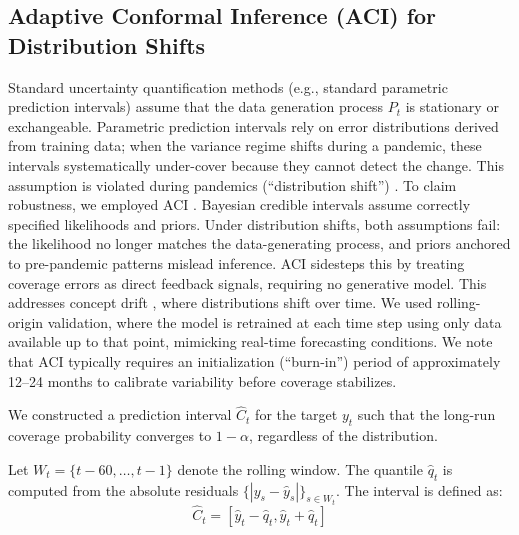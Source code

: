 \documentclass[final,3p,times,twocolumn,authoryear]{elsarticle}
\begin{document}
\subsection{Adaptive Conformal Inference (ACI) for Distribution Shifts}
\label{sec:aci_math}
Standard uncertainty quantification methods (e.g., standard parametric prediction intervals) assume that the data generation process $P_t$ is stationary or exchangeable. Parametric prediction intervals rely on error distributions derived from training data; when the variance regime shifts during a pandemic, these intervals systematically under-cover because they cannot detect the change. This assumption is violated during pandemics (``distribution shift'') \citep{quinonero2009dataset}. To claim robustness, we employed ACI \citep{lei2018distribution, gibbs2021adaptive, angelopoulos2022gentle}. Bayesian credible intervals assume correctly specified likelihoods and priors. Under distribution shifts, both assumptions fail: the likelihood no longer matches the data-generating process, and priors anchored to pre-pandemic patterns mislead inference. ACI sidesteps this by treating coverage errors as direct feedback signals, requiring no generative model. This addresses concept drift \citep{gama2014survey}, where distributions shift over time. We used rolling-origin validation, where the model is retrained at each time step using only data available up to that point, mimicking real-time forecasting conditions. We note that ACI typically requires an initialization (``burn-in'') period of approximately 12--24 months to calibrate variability before coverage stabilizes. 

We constructed a prediction interval $\hat{C}_t$ for the target $y_t$ such that the long-run coverage probability converges to $1-\alpha$, regardless of the distribution.

Let $W_t = \{t-60, \ldots, t-1\}$ denote the rolling window. The quantile $\hat{q}_t$ is computed from the absolute residuals $\{|y_s - \hat{y}_s|\}_{s \in W_t}$. The interval is defined as:
\begin{equation}
\label{eq:aci_interval}
\hat{C}_t = [\hat{y}_t - \hat{q}_t , \hat{y}_t + \hat{q}_t]
\end{equation}
\end{document}
